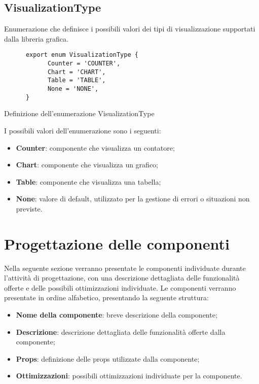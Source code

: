 \subsection{VisualizationType}
Enumerazione che definisce i possibili valori dei tipi di visualizzazione supportati dalla libreria grafica.
\begin{listing}[H]
      \begin{verbatim}
      export enum VisualizationType {
            Counter = 'COUNTER',
            Chart = 'CHART',
            Table = 'TABLE',
            None = 'NONE',
      }
      \end{verbatim}
      \caption{Definizione dell'enumerazione VisualizationType}
      \label{listing:visualizationType}
\end{listing}
I possibili valori dell'enumerazione sono i seguenti:
\begin{itemize}
      \item \textbf{Counter}: componente che visualizza un contatore;
      \item \textbf{Chart}: componente che visualizza un grafico;
      \item \textbf{Table}: componente che visualizza una tabella;
      \item \textbf{None}: valore di default, utilizzato per la gestione di errori o situazioni non previste.
\end{itemize}

\section{Progettazione delle componenti}
Nella seguente sezione verranno presentate le componenti individuate durante l'attività di progettazione, con una descrizione dettagliata delle
funzionalità offerte e delle possibili ottimizzazioni individuate. \newline
Le componenti verranno presentate in ordine alfabetico, presentando la seguente struttura:
\begin{itemize}
      \item \textbf{Nome della componente}: breve descrizione della componente;
      \item \textbf{Descrizione}: descrizione dettagliata delle funzionalità offerte dalla componente;
      \item \textbf{Props}: definizione delle props utilizzate dalla componente;
      \item \textbf{Ottimizzazioni}: possibili ottimizzazioni individuate per la componente.
\end{itemize}


